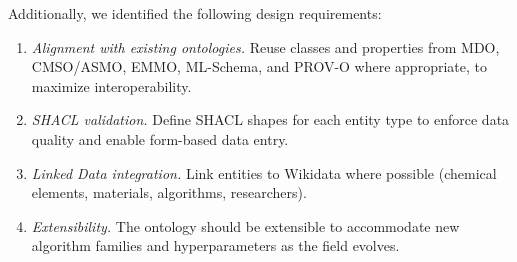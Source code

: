 Additionally, we identified the following design requirements:

\begin{enumerate}
\item[DR1.] \emph{Alignment with existing ontologies.} Reuse classes and
  properties from MDO, CMSO/ASMO, EMMO, ML-Schema, and PROV-O where
  appropriate, to maximize interoperability.
\item[DR2.] \emph{SHACL validation.} Define SHACL shapes for each entity
  type to enforce data quality and enable form-based data entry.
\item[DR3.] \emph{Linked Data integration.} Link entities to Wikidata where
  possible (chemical elements, materials, algorithms, researchers).
\item[DR4.] \emph{Extensibility.} The ontology should be extensible to
  accommodate new algorithm families and hyperparameters as the field evolves.
\end{enumerate}

